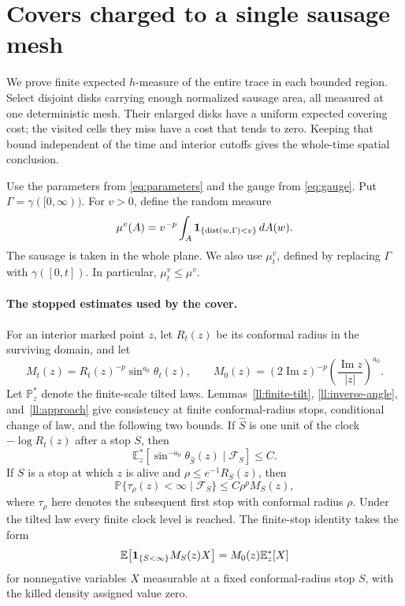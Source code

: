 
\section{Covers charged to a single sausage mesh}
\label{sec:dense-cover}

We prove finite expected $h$-measure of the entire trace in each bounded
region. Select disjoint disks carrying enough normalized sausage area,
all measured at one deterministic mesh. Their enlarged disks have a
uniform expected covering cost; the visited cells they miss have a cost
that tends to zero. Keeping that bound independent of the time and
interior cutoffs gives the whole-time spatial conclusion.

Use the parameters from \eqref{eq:parameters} and the gauge
from \eqref{eq:gauge}. Put
\(\Gamma=\gamma([0,\infty))\).  For \(v>0\), define the random measure
\begin{equation}
 \mu^v(A)=v^{-p}\int_A
       {\bf1}_{\{\operatorname{dist}(w,\Gamma)<v\}}\,dA(w).
 \label{eq:cover-sausage}
\end{equation}
The sausage is taken in the whole plane.  We also use \(\mu_t^v\),
defined by replacing \(\Gamma\) with \(\gamma([0,t])\).  In particular,
\(\mu_t^v\le\mu^v\).

\paragraph{The stopped estimates used by the cover.}
For an interior marked point \(z\), let \(R_t(z)\) be its conformal
radius in the surviving domain, and let
\[
 M_t(z)=R_t(z)^{-p}\sin^{a_0}\theta_t(z),\qquad
 M_0(z)=(2\operatorname{Im}z)^{-p}
        \left(\frac{\operatorname{Im}z}{|z|}\right)^{a_0}.
\]
Let \(\mathbb P_z^*\) denote the finite-scale tilted laws.  Lemmas~\ref{ll:finite-tilt}, \ref{ll:inverse-angle}, and~\ref{ll:approach}
give consistency at finite conformal-radius stops, conditional change
of law, and the following two bounds.
If \(\widehat S\) is one unit of the clock \(-\log R_t(z)\)
after a stop \(S\), then
\begin{equation}
 \mathbb E_z^*\!\left[
      \sin^{-a_0}\theta_{\widehat S}(z)\mid\mathcal F_S\right]\le C.
 \label{eq:cover-angle}
\end{equation}
If \(S\) is a stop at which \(z\) is alive and
\(\rho\le e^{-1}R_S(z)\), then
\begin{equation}
 \mathbb P\{\tau_\rho(z)<\infty\mid\mathcal F_S\}
      \le C\rho^p M_S(z),
 \label{eq:cover-one-point}
\end{equation}
where \(\tau_\rho\) here denotes the subsequent first stop with
conformal radius \(\rho\).  Under the tilted law every finite clock
level is reached.  The finite-stop identity takes the form
\begin{equation}
 \mathbb E\!\left[
       {\bf1}_{\{S<\infty\}}M_S(z)X\right]
        =M_0(z)\mathbb E_z^*[X]
 \label{eq:cover-finite-tilt}
\end{equation}
for nonnegative variables \(X\) measurable at a fixed conformal-radius
stop \(S\), with the killed density assigned value zero.

